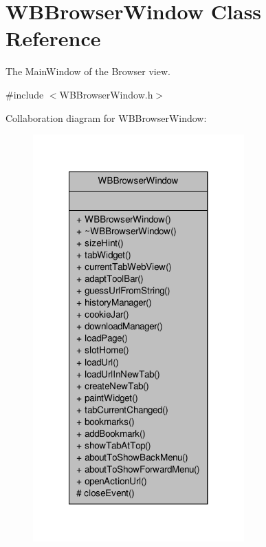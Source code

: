 \hypertarget{class_w_b_browser_window}{\section{W\-B\-Browser\-Window Class Reference}
\label{d4/d1c/class_w_b_browser_window}
}


The Main\-Window of the Browser view.  




{\ttfamily \#include $<$W\-B\-Browser\-Window.\-h$>$}



Collaboration diagram for W\-B\-Browser\-Window\-:
\nopagebreak
\begin{figure}[H]
\begin{center}
\leavevmode
\includegraphics[width=230pt]{d4/deb/class_w_b_browser_window__coll__graph}
\end{center}
\end{figure}
